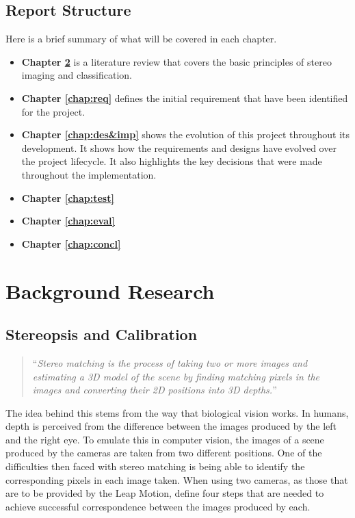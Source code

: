\documentclass[11pt,oneside]{report}
\begin{document}
		\section{Report Structure}
			Here is a brief summary of what will be covered in each chapter.
			\begin{itemize}
			 \item \textbf{Chapter \ref{chap:background}}
			 	is a literature review that covers the basic principles of stereo imaging and classification.
			 \item \textbf{Chapter \ref{chap:req}}
			 	defines the initial requirement that have been identified for the project.
			 \item \textbf{Chapter \ref{chap:des&imp}}
			 	shows the evolution of this project throughout its development.
			 	It shows how the requirements and designs have evolved over the project lifecycle.
			 	It also highlights the key decisions that were made throughout the implementation.
			 \item \textbf{Chapter \ref{chap:test}}
			 	
			 \item \textbf{Chapter \ref{chap:eval}}
			 
			 \item \textbf{Chapter \ref{chap:concl}}
			\end{itemize}				
			
		
	\chapter{Background Research}\label{chap:background}
			\section{Stereopsis and Calibration}
			\begin{quote}
				``\textit{Stereo matching is the process of taking two or more images and estimating a 3D model of the scene by finding matching pixels in the images and converting their 2D positions into 3D depths.}''\cite{book:sam}
			\end{quote}
			The idea behind this stems from the way that biological vision works.
			In humans, depth is perceived from the difference between the images produced by the left and the right eye.
			To emulate this in computer vision, the images of a scene produced by the cameras are taken from two different positions.
			One of the difficulties then faced with stereo matching is being able to identify the corresponding pixels in each image taken.
			When using two cameras, as those that are to be provided by the Leap Motion,  define four steps that are needed to achieve successful correspondence between the images produced by each.
			
\end{document}
